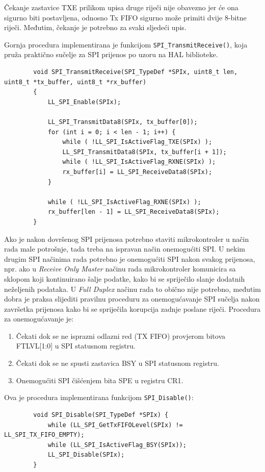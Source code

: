 		Čekanje zastavice TXE prilikom upisa druge riječi nije obavezno jer će ona sigurno biti postavljena, odnosno Tx FIFO sigurno može primiti dvije 8-bitne riječi. Međutim, čekanje je potrebno za svaki sljedeći upis.

		Gornja procedura implementirana je funkcijom \texttt{SPI\_TransmitReceive()}, koja pruža praktično sučelje za SPI prijenos po uzoru na HAL biblioteke.

		\begin{lstlisting}
		void SPI_TransmitReceive(SPI_TypeDef *SPIx, uint8_t len, uint8_t *tx_buffer, uint8_t *rx_buffer) 
		{
			LL_SPI_Enable(SPIx);
			
			LL_SPI_TransmitData8(SPIx, tx_buffer[0]);
			for (int i = 0; i < len - 1; i++) {
				while ( !LL_SPI_IsActiveFlag_TXE(SPIx) );
				LL_SPI_TransmitData8(SPIx, tx_buffer[i + 1]);
				while ( !LL_SPI_IsActiveFlag_RXNE(SPIx) );
				rx_buffer[i] = LL_SPI_ReceiveData8(SPIx);
			}
			
			while ( !LL_SPI_IsActiveFlag_RXNE(SPIx) );
			rx_buffer[len - 1] = LL_SPI_ReceiveData8(SPIx);
		}
		\end{lstlisting}
	
		Ako je nakon dovršenog SPI prijenosa potrebno staviti mikrokontroler u način rada male potrošnje, tada treba na ispravan način onemogućiti SPI. U nekim drugim SPI načinima rada potrebno je onemogućiti SPI nakon svakog prijenosa, npr. ako u \textit{Receive Only Master} načinu rada mikrokontroler komunicira sa sklopom koji kontinuirano šalje podatke, kako bi se spriječilo slanje dodatnih neželjenih podataka. U \textit{Full Duplex} načinu rada to obično nije potrebno, međutim dobra je praksa slijediti pravilnu proceduru za onemogućavanje SPI sučelja nakon završetka prijenosa kako bi se spriječila korupcija zadnje poslane riječi. Procedura za onemogućavanje je:
		
		\begin{enumerate}
			\item Čekati dok se ne isprazni odlazni red (TX FIFO) provjerom bitova FTLVL[1:0] u SPI statusnom registru.
			\item Čekati dok se ne spusti zastavica BSY u SPI statusnom registru.
			\item Onemogućiti SPI čišćenjem bita SPE u registru CR1.
		\end{enumerate}

		Ova je procedura implementirana funkcijom \texttt{SPI\_Disable()}:

		\begin{lstlisting}
		void SPI_Disable(SPI_TypeDef *SPIx) {
			while (LL_SPI_GetTxFIFOLevel(SPIx) != LL_SPI_TX_FIFO_EMPTY);
			while (LL_SPI_IsActiveFlag_BSY(SPIx));
			LL_SPI_Disable(SPIx);
		}
		\end{lstlisting}
		
